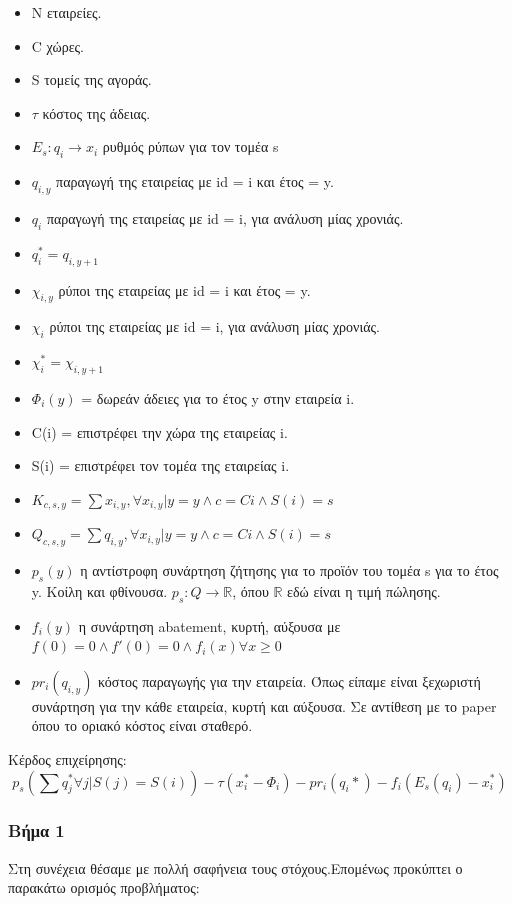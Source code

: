 \documentclass[a4paper,twoside,10pt]{article}
\newcommand{\R}{{\mathbb R}}
\begin{document}
\begin{itemize}
	\item Ν εταιρείες.
	\item C χώρες.
	\item S τομείς της αγοράς. 
	\item $\tau$ κόστος της άδειας.
	\item $E_s: q_i \rightarrow x_i $ ρυθμός ρύπων για τον τομέα s
	\item $q_{i,y}$ παραγωγή της εταιρείας με id = i και έτος = y.
	\item $q_i$ παραγωγή της εταιρείας με id = i, για ανάλυση μίας χρονιάς.
	\item $q_i^* = q_{i,y+1}$
	\item $χ_{i,y}$ ρύποι της εταιρείας με id = i και έτος = y.
	\item $χ_i$ ρύποι της εταιρείας με id = i, για ανάλυση μίας χρονιάς.
	\item $χ_i^* = χ_{i,y+1}$
	\item $\Phi_i(y)$ = δωρεάν άδειες για το έτος y στην εταιρεία i.
	\item C(i) = επιστρέφει την χώρα της εταιρείας i.
	\item S(i) = επιστρέφει τον τομέα της εταιρείας i.
	\item $K_{c,s,y} = \sum{x_{i,y}}, \forall x_{i,y} | y=y \wedge c = C{i} \wedge S(i) = s$
	\item $Q_{c,s,y} = \sum{q_{i,y}}, \forall x_{i,y} | y=y \wedge c = C{i} \wedge S(i) = s$
	\item $p_s(y)$ η αντίστροφη συνάρτηση ζήτησης για το προϊόν του τομέα s για το έτος y. Κοίλη και φθίνουσα. $ p_s : Q \rightarrow \R$, όπου $\R$ εδώ είναι η τιμή πώλησης.
	\item $f_i(y)$ η συνάρτηση abatement, κυρτή, αύξουσα με $f(0)=0 \wedge f'(0) = 0 \wedge f_i(x) \forall x \geq 0$
	\item $pr_i(q_{i,y})$ κόστος παραγωγής για την εταιρεία. Όπως είπαμε είναι ξεχωριστή συνάρτηση για την κάθε εταιρεία, κυρτή και αύξουσα. Σε αντίθεση με το paper \cite{Allocating} όπου το οριακό κόστος είναι σταθερό.
\end{itemize}

Κέρδος επιχείρησης:
$$ p_s (\sum {q_j^*} \forall j | S(j) = S(i))- \tau (x_i^* - \Phi_i)- pr_i(q_i*) - f_i(E_s(q_i)- x_i^*)	  $$
\subsubsection{Βήμα 1}
Στη συνέχεια θέσαμε με πολλή σαφήνεια τους στόχους.Επομένως προκύπτει ο παρακάτω ορισμός προβλήματος:
\end{document}
